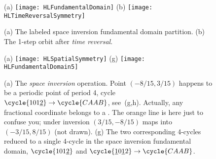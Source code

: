 \begin{description}
\begin{figure}
  \centering
(a) \texttt{[image: HLFundamentalDomain]}
(b) \texttt{[image: HLTimeReversalSymmetry]}
  \caption{\label{fig:HLFundamentalDomainA}
(a) The labeled space inversion fundamental domain partition.
(b) The 1-step orbit after \emph{time reversal}.
}
\end{figure}


\begin{figure}
  \centering
(a) \texttt{[image: HLSpatialSymmetry]}
(g) \texttt{[image: HLFundamentalDomain5]}
  \caption{\label{fig:HLSpatialSymmetry}
(a) The \emph{space inversion} operation. Point $(-8/15,3/15)$ happens
    to be a periodic point of period 4, cycle $\cycle{1 0 1
    \underline{2}}\to\cycle{CAAB}$, see
    \,(g,h). Actually, any fractional
    coordinate belongs to a \po. The orange line is here just to confuse
    you; under inversion $(3/15,-8/15)$ maps into $(-3/15,8/15)$ (not
    drawn).
(g) The two corresponding 4-cycles reduced to a single 4-cycle in
    the space inversion fundamental domain, $\cycle{1 0 1 \underline{2}}$
    and $\cycle{\underline{1} 0 \underline{1} 2}\to\cycle{CAAB}$.
        }
\end{figure}


\end{description}
